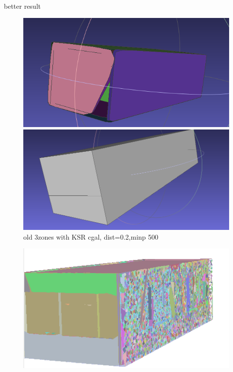 \documentclass[10pt]{beamer}
\begin{document}
\begin{frame}{better result }
    \begin{figure}[H]
        \centering
        \begin{minipage}[t]{0.40\textwidth}
          \includegraphics[width=\textwidth]{../../images/screen_kinetic/3zones_before_primitive.png}
        \end{minipage}
        \begin{minipage}[t]{0.43\textwidth}
            \includegraphics[width=\textwidth]{../../images/screen_kinetic/3zones_result_normal5_cgal.png}
        \end{minipage}
        \caption{old 3zones with KSR cgal, dist=0.2,minp 500}
      \end{figure}  
    \begin{figure}[H]
        \centering
        \begin{minipage}[t]{0.40\textwidth}
          \includegraphics[width=\textwidth]{../../images/screen_kinetic/3zones_primive.png}

\end{minipage}
\end{figure}
\end{frame}
\end{document}
